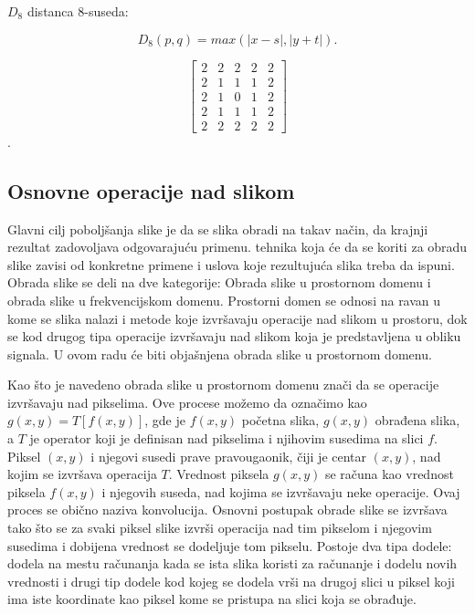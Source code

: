 \documentclass[a4paper,12pt,titlepage]{article}
\begin{document}
$D_{8}$ distanca 8-suseda:

\begin{equation}\label{eq:8ne}
D_{8}(p, q) = max(|x - s|, |y + t|).
\end{equation} 

\[
\begin{bmatrix}
2 & 2 & 2 & 2 & 2 \\
2 & 1 & 1 & 1 & 2 \\
2 & 1 & 0 & 1 & 2 \\
2 & 1 & 1 & 1 & 2 \\
2 & 2 & 2 & 2 & 2 
\end{bmatrix}
\].

\subsection{Osnovne operacije nad slikom}%

Glavni cilj poboljšanja slike je da se slika obradi na takav način, da krajnji rezultat zadovoljava odgovarajuću primenu. tehnika koja će da se koriti za obradu slike zavisi od konkretne primene i uslova koje rezultujuća slika treba da ispuni. Obrada slike se deli na dve kategorije: Obrada slike u prostornom domenu i obrada slike u frekvencijskom domenu. Prostorni domen se odnosi na ravan u kome se slika nalazi i metode koje izvršavaju operacije nad slikom u prostoru, dok se kod drugog tipa operacije izvršavaju nad slikom koja je predstavljena u obliku signala. U ovom radu će biti objašnjena obrada slike u prostornom domenu.

Kao što je navedeno obrada slike u prostornom domenu znači da se operacije izvršavaju nad pikselima. Ove procese možemo da označimo kao $g(x, y) = T[f(x, y)]$, gde je $f(x, y)$ početna slika, $g(x, y)$ obrađena slika, a $T$ je operator koji je definisan nad pikselima i njihovim susedima na slici $f$. Piksel $(x, y)$ i njegovi susedi prave pravougaonik, čiji je centar $(x, y)$, nad kojim se izvršava operacija $T$. Vrednost piksela $g(x, y)$ se računa kao vrednost piksela $f(x, y)$ i njegovih suseda, nad kojima se izvršavaju neke operacije. Ovaj proces se obično naziva konvolucija. Osnovni postupak obrade slike se izvršava tako što se za svaki piksel slike izvrši operacija nad tim pikselom i njegovim susedima i dobijena vrednost se dodeljuje tom pikselu. Postoje dva tipa dodele: dodela na mestu računanja kada se ista slika koristi za računanje i dodelu novih vrednosti i drugi tip dodele kod kojeg se dodela vrši na drugoj slici u piksel koji ima iste koordinate kao piksel kome se pristupa na slici koja se obrađuje. 
\end{document}
